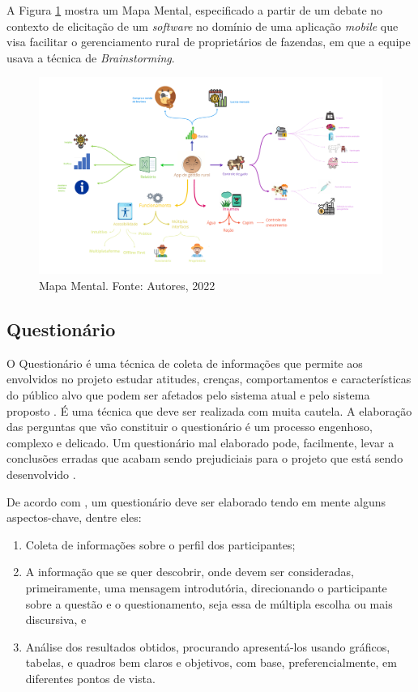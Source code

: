 A Figura \ref{fig:mind_map} mostra um Mapa Mental, especificado a partir de um debate no contexto de elicitação de um \textit{software} no domínio de uma aplicação \textit{mobile} que visa facilitar o gerenciamento rural de proprietários de fazendas, em que a equipe usava a técnica de \textit{Brainstorming}.

\begin{figure}[H]
    \begin{center}
        \includegraphics[scale=0.15]{figuras/Embasamento/MindMap.png}
        \caption{{Mapa Mental. Fonte: Autores, 2022}}
        \label{fig:mind_map}
    \end{center}
\end{figure}

\subsection{Questionário}

\label{sec:questionario}

O Questionário é uma técnica de coleta de informações que permite aos envolvidos no projeto estudar atitudes, crenças, comportamentos e características do público alvo que podem ser afetados pelo sistema atual e pelo sistema proposto \cite{kendall1992systems}. É uma técnica que deve ser realizada com muita cautela. A elaboração das perguntas que vão constituir o questionário é um processo engenhoso, complexo e delicado. Um questionário mal elaborado pode, facilmente, levar a conclusões erradas que acabam sendo prejudiciais para o projeto que está sendo desenvolvido \cite{bastosjunior}.

De acordo com \cite{segundo2017custom}, um questionário deve ser elaborado tendo em mente alguns aspectos-chave, dentre eles: 

\begin{enumerate}
    \item Coleta de informações sobre o perfil dos participantes; 
    \item A informação que se quer descobrir, onde devem ser consideradas, primeiramente, uma mensagem  introdutória, direcionando o participante sobre a questão e o questionamento, seja essa de múltipla escolha ou mais discursiva, e
    \item Análise dos resultados obtidos, procurando apresentá-los usando gráficos, tabelas, e quadros bem claros e objetivos, com base, preferencialmente, em diferentes pontos de vista.
\end{enumerate}

